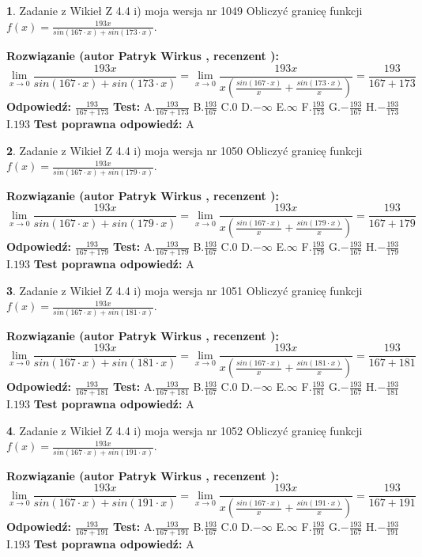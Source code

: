 \documentclass[12pt, a4paper]{article}
\theoremstyle{definition} %
\newtheorem{zad}{}
\newcommand{\zadStart}[1]{\begin{zad}#1\newline}
\newcommand{\zadStop}{\end{zad}}
\newcommand{\rozwStart}[2]{\noindent \textbf{Rozwiązanie (autor #1 , recenzent #2): }\newline}
\newcommand{\rozwStop}{\newline}
\newcommand{\odpStart}{\noindent \textbf{Odpowiedź:}\newline}
\newcommand{\odpStop}{\newline}
\newcommand{\testStart}{\noindent \textbf{Test:}\newline}
\newcommand{\testStop}{\newline}
\newcommand{\kluczStart}{\noindent \textbf{Test poprawna odpowiedź:}\newline}
\newcommand{\kluczStop}{\newline}
\begin{document}
\zadStart{Zadanie z Wikieł Z 4.4 i) moja wersja nr 1049}
Obliczyć granicę funkcji $f(x)=\frac{193x}{sin(167\cdot x) +sin(173\cdot x)}$.
\zadStop
\rozwStart{Patryk Wirkus}{}
$$\lim\limits_{x\to 0}\frac{193x}{sin(167\cdot x) +sin(173\cdot x)}=\lim\limits_{x\to 0}\frac{193x}{x(\frac{sin(167\cdot x)}{x}+\frac{sin(173\cdot x)}{x})}=\frac{193}{167+173}$$
\rozwStop
\odpStart
$\frac{193}{167+173}$
\odpStop
\testStart
A.$\frac{193}{167+173}$
B.$\frac{193}{167}$
C.$0$
D.$-\infty$
E.$\infty$
F.$\frac{193}{173}$
G.$-\frac{193}{167}$
H.$-\frac{193}{173}$
I.$193$
\testStop
\kluczStart
A
\kluczStop



\zadStart{Zadanie z Wikieł Z 4.4 i) moja wersja nr 1050}
Obliczyć granicę funkcji $f(x)=\frac{193x}{sin(167\cdot x) +sin(179\cdot x)}$.
\zadStop
\rozwStart{Patryk Wirkus}{}
$$\lim\limits_{x\to 0}\frac{193x}{sin(167\cdot x) +sin(179\cdot x)}=\lim\limits_{x\to 0}\frac{193x}{x(\frac{sin(167\cdot x)}{x}+\frac{sin(179\cdot x)}{x})}=\frac{193}{167+179}$$
\rozwStop
\odpStart
$\frac{193}{167+179}$
\odpStop
\testStart
A.$\frac{193}{167+179}$
B.$\frac{193}{167}$
C.$0$
D.$-\infty$
E.$\infty$
F.$\frac{193}{179}$
G.$-\frac{193}{167}$
H.$-\frac{193}{179}$
I.$193$
\testStop
\kluczStart
A
\kluczStop



\zadStart{Zadanie z Wikieł Z 4.4 i) moja wersja nr 1051}
Obliczyć granicę funkcji $f(x)=\frac{193x}{sin(167\cdot x) +sin(181\cdot x)}$.
\zadStop
\rozwStart{Patryk Wirkus}{}
$$\lim\limits_{x\to 0}\frac{193x}{sin(167\cdot x) +sin(181\cdot x)}=\lim\limits_{x\to 0}\frac{193x}{x(\frac{sin(167\cdot x)}{x}+\frac{sin(181\cdot x)}{x})}=\frac{193}{167+181}$$
\rozwStop
\odpStart
$\frac{193}{167+181}$
\odpStop
\testStart
A.$\frac{193}{167+181}$
B.$\frac{193}{167}$
C.$0$
D.$-\infty$
E.$\infty$
F.$\frac{193}{181}$
G.$-\frac{193}{167}$
H.$-\frac{193}{181}$
I.$193$
\testStop
\kluczStart
A
\kluczStop



\zadStart{Zadanie z Wikieł Z 4.4 i) moja wersja nr 1052}
Obliczyć granicę funkcji $f(x)=\frac{193x}{sin(167\cdot x) +sin(191\cdot x)}$.
\zadStop
\rozwStart{Patryk Wirkus}{}
$$\lim\limits_{x\to 0}\frac{193x}{sin(167\cdot x) +sin(191\cdot x)}=\lim\limits_{x\to 0}\frac{193x}{x(\frac{sin(167\cdot x)}{x}+\frac{sin(191\cdot x)}{x})}=\frac{193}{167+191}$$
\rozwStop
\odpStart
$\frac{193}{167+191}$
\odpStop
\testStart
A.$\frac{193}{167+191}$
B.$\frac{193}{167}$
C.$0$
D.$-\infty$
E.$\infty$
F.$\frac{193}{191}$
G.$-\frac{193}{167}$
H.$-\frac{193}{191}$
I.$193$
\testStop
\kluczStart
A
\kluczStop
\end{document}
